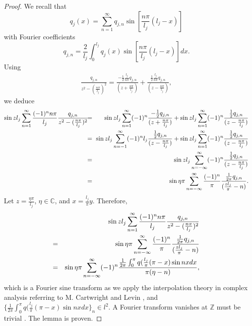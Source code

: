 \documentclass[10pt,a4paper]{article}
\theoremstyle{plain}
\theoremstyle{definition}
\theoremstyle{remark}
\numberwithin{equation}{section}
\begin{document}
\begin{proof}
We recall that 
$$q_{j}(x)=\sum_{n=1}^{\infty}q_{j,n}\sin[\frac{n\pi}{l_{j}} (l_{j}-x)]$$ with Fourier coefficients
$$q_{j,n}=\frac{2}{l_{j}}\int_{0}^{l_{j}}q_{j}(x)\sin[\frac{n\pi}{l_{j}} (l_{j}-x)]dx.$$
Using
\begin{eqnarray}
\frac{q_{j,n}}{z^{2}-(\frac{n\pi}{l_{j}})^{2}}=\frac{-\frac{1}{2}\frac{l_{j}}{n\pi}q_{j,n}}{(z+\frac{n\pi}{l_{j}})}+\frac{\frac{1}{2}\frac{l_{j}}{n\pi}q_{j,n}}{(z-\frac{n\pi}{l_{j}})},
\end{eqnarray}
we deduce
\begin{eqnarray}\nonumber
\sin{z l_{j}}\sum_{n=1}^{\infty}\frac{(-1)^{n}n\pi}{l_{j}}\frac{q_{j,n}}{z^{2}-(\frac{n\pi}{l_{j}})^{2}}&\hspace{-4pt}=\hspace{-4pt}&\sin{z l_{j}}\sum_{n=1}^{\infty}(-1)^{n}\frac{-\frac{1}{2}q_{j,n}}{(z+\frac{n\pi}{l_{j}})}+\sin{z l_{j}}\sum_{n=1}^{\infty}(-1)^{n}\frac{\frac{1}{2}q_{j,n}}{(z-\frac{n\pi}{l_{j}})}\\\nonumber
&\hspace{-4pt}=\hspace{-4pt}&\sin{z l_{j}}\sum_{n=-1}^{\infty}(-1)^{n}{l_{j}}\frac{\frac{1}{2}q_{j,n}}{(z-\frac{n\pi}{l_{j}})}+\sin{z l_{j}}\sum_{n=1}^{\infty}(-1)^{n}\frac{\frac{1}{2}q_{j,n}}{(z-\frac{n\pi}{l_{j}})}
\\&\hspace{-4pt}=\hspace{-4pt}&\sin{z l_{j}}\sum_{n=-\infty}^{\infty}(-1)^{n}\frac{\frac{1}{2}q_{j,n}}{(z-\frac{n\pi}{l_{j}})}\nonumber
\\&\hspace{-4pt}=\hspace{-4pt}&\sin{\eta\pi}\sum_{n=-\infty}^{\infty}\frac{(-1)^{n}}{\pi}\frac{\frac{1}{2\pi}q_{j,n}}{(\frac{zl_{j}}{\pi}-n)}.
\end{eqnarray}
Let $z=\frac{\eta\pi}{l_{j}}$, $\eta\in\mathbb{C}$, and $x=\frac{l_{j}}{\pi}y$. Therefore,
\begin{eqnarray}\nonumber
&&\sin{z l_{j}}\sum_{n=1}^{\infty}\frac{(-1)^{n}n\pi}{l_{j}}\frac{q_{j,n}}{z^{2}-(\frac{n\pi}{l_{j}})^{2}}\\&\hspace{-4pt}=&\sin{\eta\pi}\sum_{n=-\infty}^{\infty}\frac{(-1)^{n}}{\pi}\frac{\frac{1}{2\pi}q_{j,n}}{(\frac{zl_{j}}{\pi}-n)}\nonumber
\\&\hspace{-4pt}=&\sin{\eta\pi}\sum_{n=-\infty}^{\infty}(-1)^{n}\frac{\frac{1}{2\pi}\int_{0}^{\pi}q(\frac{l_{j}}{\pi}(\pi-x)\sin{nx}dx}{\pi(\eta-n)},\label{3100}
\end{eqnarray}
which is a Fourier sine transform as we apply the interpolation theory in complex analysis referring to M. Cartwright and Levin \cite[p.\,150,\,151]{Levin2}, and
$\{\frac{1}{2\pi}\int_{0}^{\pi}q(\frac{l_{j}}{\pi}(\pi-x)\sin{nx}dx\}_{n}\in l^{2}.$
A Fourier transform vanishes at $\mathbb{Z}$ must be trivial \cite[p.\,150,\,Theorem\,1]{Levin2}. The lemma is proven.

\end{proof}
\end{document}
